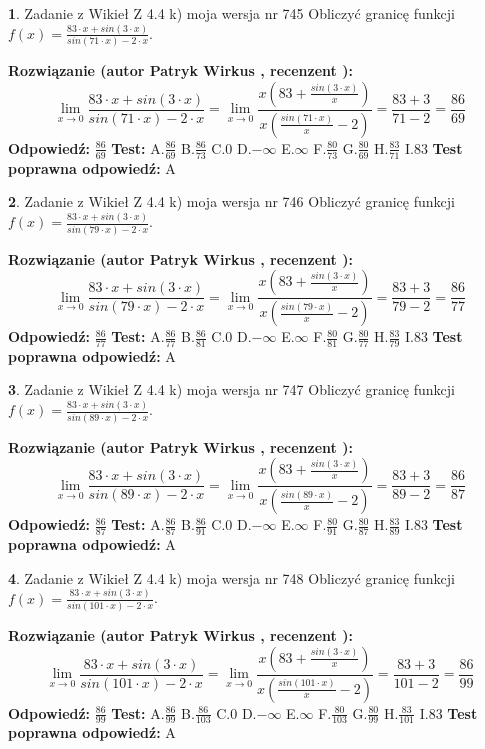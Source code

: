 \documentclass[12pt, a4paper]{article}
\theoremstyle{definition} %
\newtheorem{zad}{}
\newcommand{\zadStart}[1]{\begin{zad}#1\newline}
\newcommand{\zadStop}{\end{zad}}
\newcommand{\rozwStart}[2]{\noindent \textbf{Rozwiązanie (autor #1 , recenzent #2): }\newline}
\newcommand{\rozwStop}{\newline}
\newcommand{\odpStart}{\noindent \textbf{Odpowiedź:}\newline}
\newcommand{\odpStop}{\newline}
\newcommand{\testStart}{\noindent \textbf{Test:}\newline}
\newcommand{\testStop}{\newline}
\newcommand{\kluczStart}{\noindent \textbf{Test poprawna odpowiedź:}\newline}
\newcommand{\kluczStop}{\newline}
\begin{document}
\zadStart{Zadanie z Wikieł Z 4.4 k) moja wersja nr 745}
Obliczyć granicę funkcji $f(x)=\frac{83\cdot x +sin(3\cdot x)}{sin(71\cdot x) -2\cdot x}$.
\zadStop
\rozwStart{Patryk Wirkus}{}
$$\lim\limits_{x\to 0}\frac{83\cdot x +sin(3\cdot x)}{sin(71\cdot x) -2\cdot x}
=\lim\limits_{x\to 0}\frac{x(83+\frac{sin(3\cdot x)}{x})}{x(\frac{sin(71\cdot x)}{x}-2)}
=\frac{83+3}{71-2} = \frac{86}{69}$$
\rozwStop
\odpStart
$\frac{86}{69}$
\odpStop
\testStart
A.$\frac{86}{69}$
B.$\frac{86}{73}$
C.$0$
D.$-\infty$
E.$\infty$
F.$\frac{80}{73}$
G.$\frac{80}{69}$
H.$\frac{83}{71}$
I.$83$
\testStop
\kluczStart
A
\kluczStop



\zadStart{Zadanie z Wikieł Z 4.4 k) moja wersja nr 746}
Obliczyć granicę funkcji $f(x)=\frac{83\cdot x +sin(3\cdot x)}{sin(79\cdot x) -2\cdot x}$.
\zadStop
\rozwStart{Patryk Wirkus}{}
$$\lim\limits_{x\to 0}\frac{83\cdot x +sin(3\cdot x)}{sin(79\cdot x) -2\cdot x}
=\lim\limits_{x\to 0}\frac{x(83+\frac{sin(3\cdot x)}{x})}{x(\frac{sin(79\cdot x)}{x}-2)}
=\frac{83+3}{79-2} = \frac{86}{77}$$
\rozwStop
\odpStart
$\frac{86}{77}$
\odpStop
\testStart
A.$\frac{86}{77}$
B.$\frac{86}{81}$
C.$0$
D.$-\infty$
E.$\infty$
F.$\frac{80}{81}$
G.$\frac{80}{77}$
H.$\frac{83}{79}$
I.$83$
\testStop
\kluczStart
A
\kluczStop



\zadStart{Zadanie z Wikieł Z 4.4 k) moja wersja nr 747}
Obliczyć granicę funkcji $f(x)=\frac{83\cdot x +sin(3\cdot x)}{sin(89\cdot x) -2\cdot x}$.
\zadStop
\rozwStart{Patryk Wirkus}{}
$$\lim\limits_{x\to 0}\frac{83\cdot x +sin(3\cdot x)}{sin(89\cdot x) -2\cdot x}
=\lim\limits_{x\to 0}\frac{x(83+\frac{sin(3\cdot x)}{x})}{x(\frac{sin(89\cdot x)}{x}-2)}
=\frac{83+3}{89-2} = \frac{86}{87}$$
\rozwStop
\odpStart
$\frac{86}{87}$
\odpStop
\testStart
A.$\frac{86}{87}$
B.$\frac{86}{91}$
C.$0$
D.$-\infty$
E.$\infty$
F.$\frac{80}{91}$
G.$\frac{80}{87}$
H.$\frac{83}{89}$
I.$83$
\testStop
\kluczStart
A
\kluczStop



\zadStart{Zadanie z Wikieł Z 4.4 k) moja wersja nr 748}
Obliczyć granicę funkcji $f(x)=\frac{83\cdot x +sin(3\cdot x)}{sin(101\cdot x) -2\cdot x}$.
\zadStop
\rozwStart{Patryk Wirkus}{}
$$\lim\limits_{x\to 0}\frac{83\cdot x +sin(3\cdot x)}{sin(101\cdot x) -2\cdot x}
=\lim\limits_{x\to 0}\frac{x(83+\frac{sin(3\cdot x)}{x})}{x(\frac{sin(101\cdot x)}{x}-2)}
=\frac{83+3}{101-2} = \frac{86}{99}$$
\rozwStop
\odpStart
$\frac{86}{99}$
\odpStop
\testStart
A.$\frac{86}{99}$
B.$\frac{86}{103}$
C.$0$
D.$-\infty$
E.$\infty$
F.$\frac{80}{103}$
G.$\frac{80}{99}$
H.$\frac{83}{101}$
I.$83$
\testStop
\kluczStart
A
\kluczStop
\end{document}
